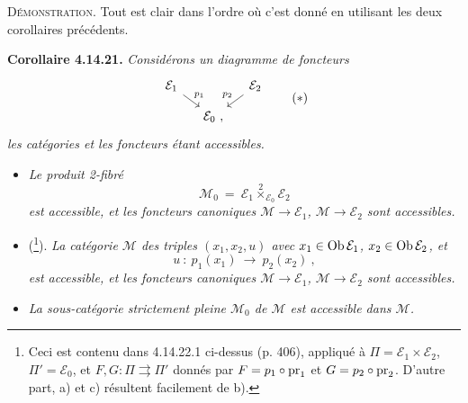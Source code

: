 \textsc{Démonstration}. Tout est clair dans l’ordre où c’est donné en utilisant les deux corollaires précédents.

\textbf{Corollaire 4.14.21.} \textit{Considérons un diagramme de foncteurs}
\[
\begin{tikzcd}[column sep=small, row sep=small]
\mathcal{E}_1 \arrow[dr, "p_1"] & & \mathcal{E}_2 \arrow[dl, "p_2"'] \\
& \mathcal{E}_0 \ , &
\end{tikzcd}
\tag*{$(*)$}
\]
\textit{les catégories et les foncteurs étant accessibles.}

\begin{itemize}[leftmargin=2.5em]
\item[\textit{a)}] \textit{Le produit 2-fibré}
\[
\mathcal{M}_0 \ = \ \mathcal{E}_1 \overset{2}{\times}_{\mathcal{E}_0} \mathcal{E}_2
\]
\textit{est accessible, et les foncteurs canoniques $\mathcal{M} \longrightarrow \mathcal{E}_1$, $\mathcal{M} \longrightarrow \mathcal{E}_2$ sont accessibles.} %
\item[\textit{b)}] (\footnote[169]{Ceci est contenu dans 4.14.22.1 ci-dessus (p. 406), appliqué à $\Pi = \mathcal{E}_1{\times}\mathcal{E}_2$, $\Pi' = \mathcal{E}_0$, et $F, G : \Pi \rightrightarrows \Pi'$ donnés par $F = p_1\circ\mathrm{pr}_1$ et $G = p_2\circ\mathrm{pr}_2$. D’autre part, a) et c) résultent facilement de b).}). \textit{La catégorie $\mathcal{M}$ des triples $(x_1,x_2,u)$ avec $x_1 \in \operatorname{Ob}\mathcal{E}_1$, $x_2 \in \operatorname{Ob}\mathcal{E}_2$, et}
\[
u \ : \ p_1(x_1) \ \longrightarrow \ p_2(x_2) \ ,
\]
\textit{est accessible, et les foncteurs canoniques $\mathcal{M} \longrightarrow \mathcal{E}_1$, $\mathcal{M} \longrightarrow \mathcal{E}_2$ sont accessibles.}
\item[\textit{c)}] \textit{La sous-catégorie strictement pleine $\mathcal{M}_0$ de $\mathcal{M}$ est accessible dans $\mathcal{M}$.}
\end{itemize}

